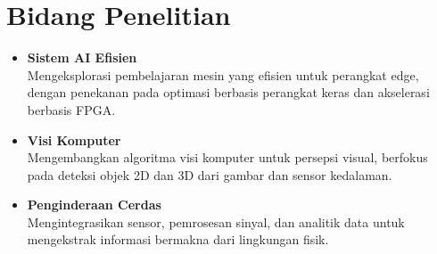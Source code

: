 \section{Bidang Penelitian}

\begin{itemize}
  \item \textbf{Sistem AI Efisien}\\
  Mengeksplorasi pembelajaran mesin yang efisien untuk perangkat edge, dengan penekanan pada optimasi berbasis perangkat keras dan akselerasi berbasis FPGA.
  \item \textbf{Visi Komputer}\\
  Mengembangkan algoritma visi komputer untuk persepsi visual, berfokus pada deteksi objek 2D dan 3D dari gambar dan sensor kedalaman.
  \item \textbf{Penginderaan Cerdas}\\
  Mengintegrasikan sensor, pemrosesan sinyal, dan analitik data untuk mengekstrak informasi bermakna dari lingkungan fisik.
\end{itemize}
